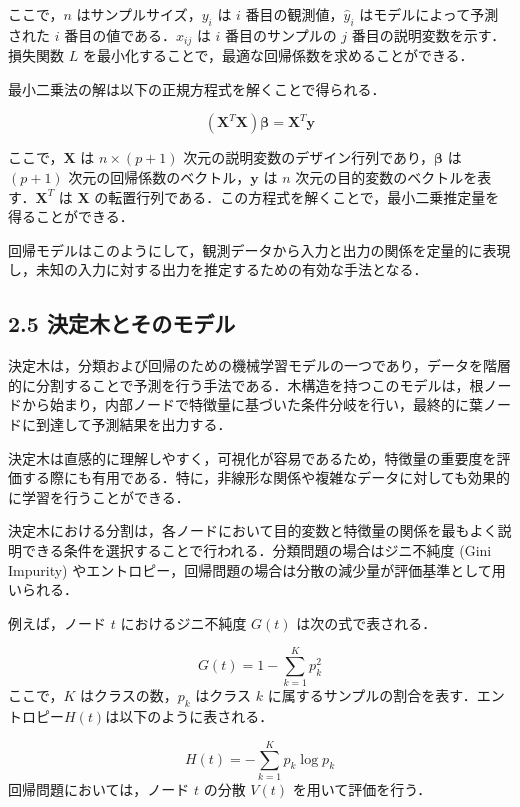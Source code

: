 \begin{itemize}
	ここで，$n$ はサンプルサイズ，$y_i$ は $i$ 番目の観測値，$\hat{y}_i$ はモデルによって予測された $i$ 番目の値である．$x_{ij}$ は $i$ 番目のサンプルの $j$ 番目の説明変数を示す．損失関数 $L$ を最小化することで，最適な回帰係数を求めることができる．
	
	最小二乗法の解は以下の正規方程式を解くことで得られる．
	
	\begin{equation}
		(\mathbf{X}^T \mathbf{X}) \mathbf{\beta} = \mathbf{X}^T \mathbf{y}
	\end{equation}
	
	ここで，$\mathbf{X}$ は $n \times (p+1)$ 次元の説明変数のデザイン行列であり，$\mathbf{\beta}$ は $(p+1)$ 次元の回帰係数のベクトル，$\mathbf{y}$ は $n$ 次元の目的変数のベクトルを表す．$\mathbf{X}^T$ は $\mathbf{X}$ の転置行列である．この方程式を解くことで，最小二乗推定量を得ることができる．
	
\end{itemize}
回帰モデルはこのようにして，観測データから入力と出力の関係を定量的に表現し，未知の入力に対する出力を推定するための有効な手法となる．


\subsection*{2.5 決定木とそのモデル}
決定木は，分類および回帰のための機械学習モデルの一つであり，データを階層的に分割することで予測を行う手法である\cite{prml}．木構造を持つこのモデルは，根ノードから始まり，内部ノードで特徴量に基づいた条件分岐を行い，最終的に葉ノードに到達して予測結果を出力する．

決定木は直感的に理解しやすく，可視化が容易であるため，特徴量の重要度を評価する際にも有用である．特に，非線形な関係や複雑なデータに対しても効果的に学習を行うことができる．

決定木における分割は，各ノードにおいて目的変数と特徴量の関係を最もよく説明できる条件を選択することで行われる．分類問題の場合はジニ不純度 (Gini Impurity) \cite{gini}やエントロピー，回帰問題の場合は分散の減少量が評価基準として用いられる．

例えば，ノード $t$ におけるジニ不純度 $G(t)$ は次の式で表される．

\begin{equation}
	G(t) = 1 - \sum_{k=1}^{K} p_k^2
\end{equation}
ここで，$K$ はクラスの数，$p_k$ はクラス $k$ に属するサンプルの割合を表す．エントロピー$H(t)$は以下のように表される．

\begin{equation}
	H(t) = - \sum_{k=1}^{K} p_k \log p_k
\end{equation}
回帰問題においては，ノード $t$ の分散 $V(t)$ を用いて評価を行う．

